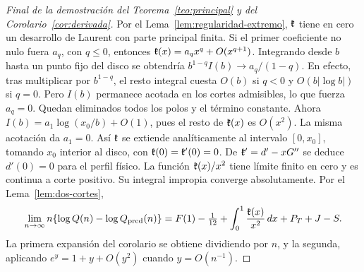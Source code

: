\begin{proof}[Final de la demostración del Teorema~\ref{teo:principal} y del
Corolario~\ref{cor:derivada}]
Por el Lema~\ref{lem:regularidad-extremo}, \(\mathfrak{k}\) tiene en cero un desarrollo de Laurent
con parte principal finita. Si el primer coeficiente no nulo fuera \(a_q\), con \(q\le0\),
entonces \(\mathfrak{k}(x)=a_qx^q+O(x^{q+1})\). Integrando desde \(b\) hasta un punto fijo del disco
se obtendría \(b^{1-q}I(b)\to a_q/(1-q)\). En efecto, tras multiplicar por \(b^{1-q}\),
el resto integral cuesta \(O(b)\) si \(q<0\) y \(O(b|\log b|)\) si \(q=0\).
Pero \(I(b)\) permanece acotada en los cortes admisibles, lo que fuerza \(a_q=0\).
Quedan eliminados todos los polos y el término constante. Ahora
\(I(b)=a_1\log(x_0/b)+O(1)\), pues el resto de \(\mathfrak{k}(x)\) es \(O(x^2)\).
La misma acotación da \(a_1=0\). Así \(\mathfrak{k}\) se extiende analíticamente al intervalo
\([0,x_0]\), tomando \(x_0\) interior al disco, con \(\mathfrak{k}(0)=\mathfrak{k}'(0)=0\).
De \(\mathfrak{k}'=d'-xG''\) se deduce \(d'(0)=0\) para el perfil físico.
La función \(\mathfrak{k}(x)/x^2\) tiene límite finito en cero y es continua a corte positivo.
Su integral impropia converge absolutamente. Por el Lema~\ref{lem:dos-cortes},
\[
 \lim_{n\to\infty}n\{\log Q(n)-\log Q_{\rm pred}(n)\}
   =F(1)-\tfrac1{12}+\int_0^1\frac{\mathfrak{k}(x)}{x^2}\,dx+P_T+J-S .
\]
La primera expansión del corolario se obtiene dividiendo por \(n\), y la segunda,
aplicando \(e^y=1+y+O(y^2)\) cuando \(y=O(n^{-1})\).
\end{proof}

